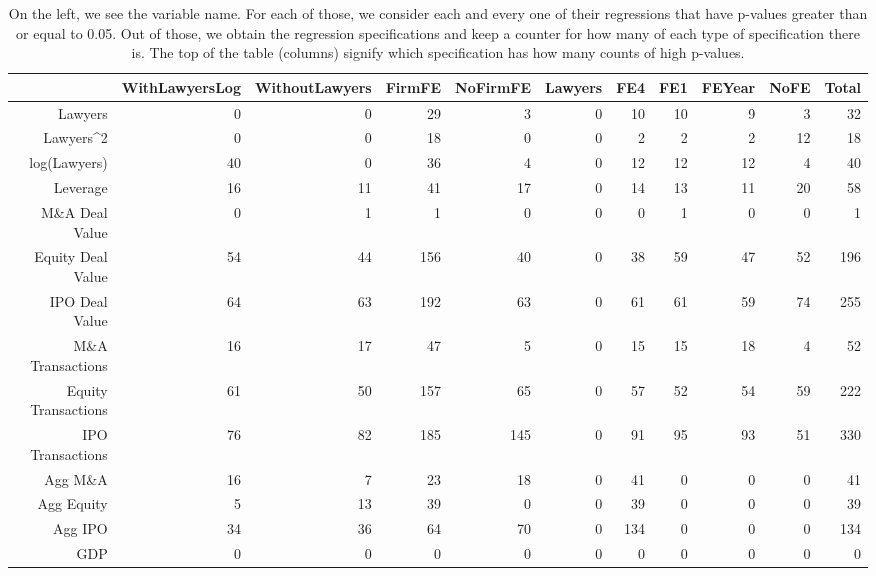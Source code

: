 \documentclass{article}
\begin{document}
\begin{table}[H]
\centering
\begin{tabular}{rrrrrrrrrrr}
  \hline
 & WithLawyersLog & WithoutLawyers & FirmFE & NoFirmFE & Lawyers & FE4 & FE1 & FEYear & NoFE & \textbf{Total} \\
  \hline
Lawyers & 0 & 0 & 29 & 3 & 0 & 10 & 10 & 9 & 3 & 32 \\
  Lawyers^2 & 0 & 0 & 18 & 0 & 0 & 2 & 2 & 2 & 12 & 18 \\
  log(Lawyers) & 40 & 0 & 36 & 4 & 0 & 12 & 12 & 12 & 4 & 40 \\
  Leverage & 16 & 11 & 41 & 17 & 0 & 14 & 13 & 11 & 20 & 58 \\
  M\&A Deal Value & 0 & 1 & 1 & 0 & 0 & 0 & 1 & 0 & 0 & 1 \\
  Equity Deal Value & 54 & 44 & 156 & 40 & 0 & 38 & 59 & 47 & 52 & 196 \\
  IPO Deal Value & 64 & 63 & 192 & 63 & 0 & 61 & 61 & 59 & 74 & 255 \\
  M\&A Transactions & 16 & 17 & 47 & 5 & 0 & 15 & 15 & 18 & 4 & 52 \\
  Equity Transactions & 61 & 50 & 157 & 65 & 0 & 57 & 52 & 54 & 59 & 222 \\
  IPO Transactions & 76 & 82 & 185 & 145 & 0 & 91 & 95 & 93 & 51 & 330 \\
  Agg M\&A & 16 & 7 & 23 & 18 & 0 & 41 & 0 & 0 & 0 & 41 \\
  Agg Equity & 5 & 13 & 39 & 0 & 0 & 39 & 0 & 0 & 0 & 39 \\
  Agg IPO & 34 & 36 & 64 & 70 & 0 & 134 & 0 & 0 & 0 & 134 \\
  GDP & 0 & 0 & 0 & 0 & 0 & 0 & 0 & 0 & 0 & 0 \\
   \hline
\end{tabular}
\caption{On the left, we see the variable name. For each of those, we consider each and every one of their regressions
  that have p-values greater than or equal to 0.05. Out of those, we obtain the regression specifications and keep a counter
  for how many of each type of specification there is. The top of the table (columns) signify which specification has how many counts of high p-values.}
\end{table}
\end{document}
